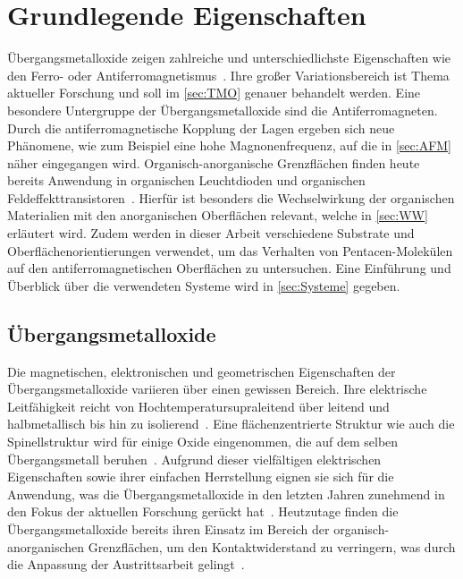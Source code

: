 \chapter{Grundlegende Eigenschaften}
    Übergangsmetalloxide zeigen zahlreiche und unterschiedlichste Eigenschaften wie den Ferro- oder Antiferromagnetismus~\cite{IF_5}.
    Ihre großer Variationsbereich ist Thema aktueller Forschung und soll im \autoref{sec:TMO} genauer behandelt werden.
    Eine besondere Untergruppe der Übergangsmetalloxide sind die Antiferromagneten.
    Durch die antiferromagnetische Kopplung der Lagen ergeben sich neue Phänomene, wie zum Beispiel eine hohe Magnonenfrequenz, auf die in \autoref{sec:AFM} näher eingegangen wird.
    Organisch-anorganische Grenzflächen finden heute bereits Anwendung in organischen Leuchtdioden und organischen Feldeffekttransistoren~\cite{IF_3}.
    Hierfür ist besonders die Wechselwirkung der organischen Materialien mit den anorganischen Oberflächen relevant, welche in \autoref{sec:WW} erläutert wird.
    Zudem werden in dieser Arbeit verschiedene Substrate und Oberflächenorientierungen verwendet, um das Verhalten von Pentacen-Molekülen auf den antiferromagnetischen Oberflächen zu untersuchen.
    Eine Einführung und Überblick über die verwendeten Systeme wird in \autoref{sec:Systeme} gegeben.

    \section{Übergangsmetalloxide} \label{sec:TMO}
        Die magnetischen, elektronischen und geometrischen Eigenschaften der Übergangsmetalloxide variieren über einen gewissen Bereich.
        Ihre elektrische Leitfähigkeit reicht von Hochtemperatursupraleitend über leitend und halbmetallisch bis hin zu isolierend~\cite{IF_5}.
        Eine flächenzentrierte Struktur wie auch die Spinellstruktur wird für einige Oxide eingenommen, die auf dem selben Übergangsmetall beruhen~\cite{FeO_26}.
        Aufgrund dieser vielfältigen elektrischen Eigenschaften sowie ihrer einfachen Herrstellung eignen sie sich für die Anwendung, was die Übergangsmetalloxide in den letzten Jahren zunehmend in den Fokus der aktuellen Forschung gerückt hat~\cite{IF_6, parkinson_iron_2016, cornell_iron_2003}.
        Heutzutage finden die Übergangsmetalloxide bereits ihren Einsatz im Bereich der organisch-anorganischen Grenzflächen, um den Kontaktwiderstand zu verringern, was durch die Anpassung der Austrittsarbeit gelingt~\cite{IF_11, NiO_40}.

